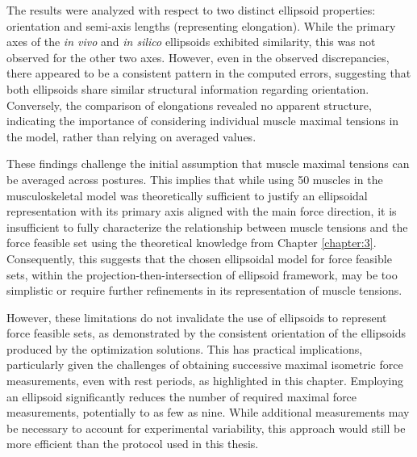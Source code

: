 The results were analyzed with respect to two distinct ellipsoid properties: orientation and semi-axis lengths (representing elongation). While the primary axes of the \emph{in vivo} and \emph{in silico} ellipsoids exhibited similarity, this was not observed for the other two axes. However, even in the observed discrepancies, there appeared to be a consistent pattern in the computed errors, suggesting that both ellipsoids share similar structural information regarding orientation. Conversely, the comparison of elongations revealed no apparent structure, indicating the importance of considering individual muscle maximal tensions in the model, rather than relying on averaged values.

These findings challenge the initial assumption that muscle maximal tensions can be averaged across postures. This implies that while using 50 muscles in the musculoskeletal model was theoretically sufficient to justify an ellipsoidal representation with its primary axis aligned with the main force direction, it is insufficient to fully characterize the relationship between muscle tensions and the force feasible set using the theoretical knowledge from Chapter \ref{chapter:3}. Consequently, this suggests that the chosen ellipsoidal model for force feasible sets, within the projection-then-intersection of ellipsoid framework, may be too simplistic or require further refinements in its representation of muscle tensions.

However, these limitations do not invalidate the use of ellipsoids to represent force feasible sets, as demonstrated by the consistent orientation of the ellipsoids produced by the optimization solutions. This has practical implications, particularly given the challenges of obtaining successive maximal isometric force measurements, even with rest periods, as highlighted in this chapter. Employing an ellipsoid significantly reduces the number of required maximal force measurements, potentially to as few as nine. While additional measurements may be necessary to account for experimental variability, this approach would still be more efficient than the protocol used in this thesis.
